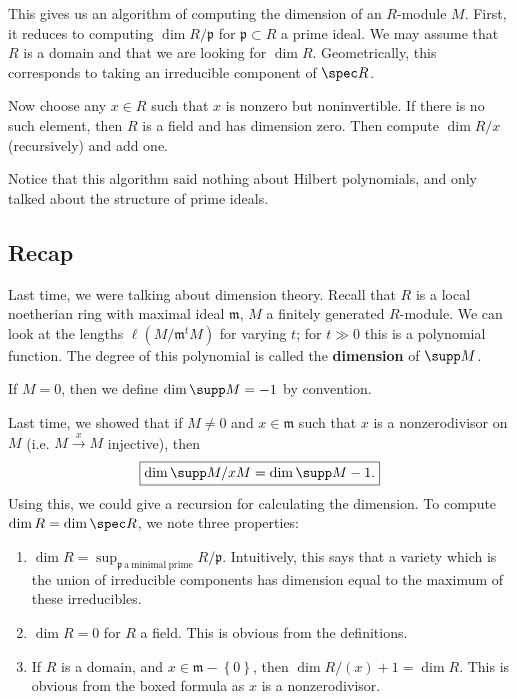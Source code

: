 This gives us an algorithm of computing the dimension of an $R$-module $M$. 
First, it reduces to computing $\dim R/\mathfrak{p}$ for $\mathfrak{p} \subset
R$ a prime ideal. We may assume that $R$ is a domain and that we are looking
for $\dim R$. Geometrically, this
corresponds to taking an irreducible component of $\spec R$.

Now choose any $x
\in R$ such that $x$ is nonzero but noninvertible. If there is no such element,
then $R$ is a field and has dimension zero. Then compute $\dim R/x$
(recursively) and add one.

Notice that this algorithm said nothing about Hilbert polynomials, and only
talked about the structure of prime ideals.

\subsection{Recap}
Last time, we were talking about dimension theory. 
Recall that $R$ is a local noetherian ring with maximal ideal $\mathfrak{m}$,
$M$ a finitely generated $R$-module. We can look at the lengths $\ell(M/\mathfrak{m}^t M)$
for varying $t$; for $t \gg 0$ this is a polynomial function. The degree of
this polynomial is called the \textbf{dimension} of $\supp M$. 

\begin{remark} 
If $M = 0$, then we define $\dim \supp M = -1$ by convention.
\end{remark} 

Last time, we showed that if $M \neq 0$ and $x \in \mathfrak{m}$ such that $x$
is a nonzerodivisor on $M$ (i.e. $M \stackrel{x}{\to} M$ injective), then 
\[ \boxed{ \dim \supp M/xM = \dim \supp M - 1.}\]
Using this, we could give a recursion for calculating the dimension. 
To compute $\dim R = \dim \spec R$, we note three properties:
\begin{enumerate}
\item $\dim R = \sup_{\mathfrak{p} \ \mathrm{a \ minimal \ prime}}
R/\mathfrak{p}$. Intuitively, this says that a variety which is the union of
irreducible components has dimension equal to the maximum of these irreducibles.
\item $\dim R = 0$ for $R$  a field. This is obvious from the definitions.
\item If $R$ is a domain, and $x \in \mathfrak{m} - \left\{0\right\}$, then
$\dim R/(x) +1 = \dim R $. This is obvious from the boxed formula as $x$ is a nonzerodivisor.
\end{enumerate}

